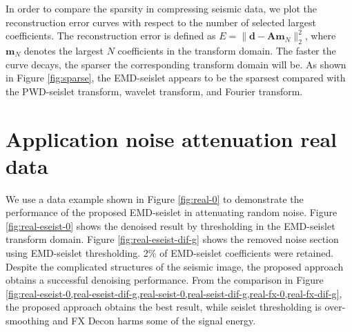 In order to compare the sparsity in compressing seismic data, we plot the reconstruction error curves with respect to the number of selected largest coefficients. The reconstruction error is defined as $E=\parallel\mathbf{d}-\mathbf{Am}_N\parallel_2^2$, where $\mathbf{m}_N$ denotes the largest $N$ coefficients in the transform domain. The faster the curve decays, the sparser the corresponding transform domain will be. As shown in Figure \ref{fig:sparse}, the EMD-seislet appears to be the sparsest compared with the PWD-seislet transform, wavelet transform, and Fourier transform.

\section{Application  noise attenuation  real data}
We use a  data example shown in Figure \ref{fig:real-0} to demonstrate the performance of the proposed EMD-seislet in attenuating random noise. Figure \ref{fig:real-eseist-0} shows the denoised result by thresholding in the EMD-seislet transform domain. Figure \ref{fig:real-eseist-dif-g} shows the removed noise section using EMD-seislet thresholding. 2\% of EMD-seislet coefficients were retained. Despite the complicated structures of the seismic image, the proposed approach obtains a successful denoising performance.  From the comparison in Figure \ref{fig:real-eseist-0,real-eseist-dif-g,real-seist-0,real-seist-dif-g,real-fx-0,real-fx-dif-g},  
the proposed approach obtains the best result, while  seislet thresholding is over-smoothing\new{,} and  FX Decon harms some of the signal energy.  


